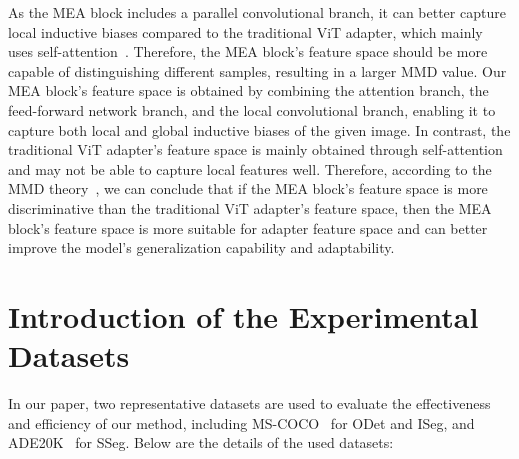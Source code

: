 As the MEA block includes a parallel convolutional branch, it can better capture local inductive biases compared to the traditional ViT adapter, which mainly uses self-attention~\citep{hu2022lora,jie2023fact,chen2022vision,ma2024segment,luo2023forgery,shao2023deepfake,mercea2024time}. 
%
Therefore, the MEA block's feature space should be more capable of distinguishing different samples, resulting in a larger MMD value. 
%
Our MEA block's feature space is obtained by combining the attention branch, the feed-forward network branch, and the local convolutional branch, enabling it to capture both local and global inductive biases of the given image. 
%
In contrast, the traditional ViT adapter's feature space is mainly obtained through self-attention and may not be able to capture local features well. Therefore, according to the MMD theory~\citep{cheng2021neural,arbel2019maximum,wang2021rethinking}, we can conclude that if the MEA block's feature space is more discriminative than the traditional ViT adapter's feature space, then the MEA block's feature space is more suitable for adapter feature space and can better improve the model's generalization capability and adaptability.

\section{Introduction of the Experimental Datasets}
\label{secS2}
{}
In our paper, two representative datasets are used to evaluate the effectiveness and efficiency of our method, including MS-COCO~\citep{caesar2018coco} for ODet and ISeg, and ADE20K~\citep{zhou2017scene} for SSeg. Below are the details of the used datasets:

